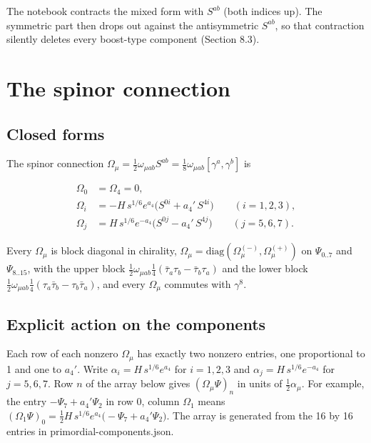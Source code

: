 \documentclass[11pt]{article}
\begin{document}
The notebook contracts the mixed form with $S^{ab}$ (both indices up). The symmetric part then drops out against the antisymmetric $S^{ab}$, so that contraction silently deletes every boost-type component (Section 8.3).

\section{The spinor connection}

\subsection{Closed forms}

The spinor connection $\Omega_\mu=\tfrac12\omega_{\mu ab}S^{ab}=\tfrac18\omega_{\mu ab}[\gamma^a,\gamma^b]$ is

\[
\begin{aligned}
\Omega_0&=\Omega_4=0,\\
\Omega_i&=-H\,s^{1/6}e^{a_4}\bigl(S^{0i}+a_4'\,S^{4i}\bigr)\qquad(i=1,2,3),\\
\Omega_j&=H\,s^{1/6}e^{-a_4}\bigl(S^{0j}-a_4'\,S^{4j}\bigr)\qquad(j=5,6,7).
\end{aligned}
\]

Every $\Omega_\mu$ is block diagonal in chirality, $\Omega_\mu=\mathrm{diag}(\Omega_\mu^{(-)},\Omega_\mu^{(+)})$ on $\Psi_{0..7}$ and $\Psi_{8..15}$, with the upper block $\tfrac12\omega_{\mu ab}\tfrac14(\bar\tau_a\tau_b-\bar\tau_b\tau_a)$ and the lower block $\tfrac12\omega_{\mu ab}\tfrac14(\tau_a\bar\tau_b-\tau_b\bar\tau_a)$, and every $\Omega_\mu$ commutes with $\gamma^8$.

\subsection{Explicit action on the components}

Each row of each nonzero $\Omega_\mu$ has exactly two nonzero entries, one proportional to 1 and one to $a_4'$. Write $\alpha_i=H\,s^{1/6}e^{a_4}$ for $i=1,2,3$ and $\alpha_j=H\,s^{1/6}e^{-a_4}$ for $j=5,6,7$. Row $n$ of the array below gives $(\Omega_\mu\Psi)_n$ in units of $\tfrac12\alpha_\mu$. For example, the entry $-\Psi_{7}+a_4'\Psi_{2}$ in row 0, column $\Omega_1$ means $(\Omega_1\Psi)_0=\tfrac12H\,s^{1/6}e^{a_4}\bigl(-\Psi_7+a_4'\Psi_2\bigr)$. The array is generated from the 16 by 16 entries in primordial-components.json.
\end{document}
